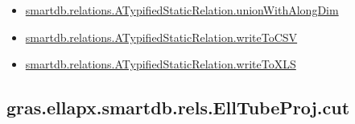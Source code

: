 \documentclass[letterpaper,10pt,english]{sphinxmanual}
\begin{document}
\begin{itemize}
\item {} 
{\hyperref[chap_functions:smartdb-relations-atypifiedstaticrelation-unionwithalongdim]{smartdb.relations.ATypifiedStaticRelation.unionWithAlongDim}}

\item {} 
{\hyperref[chap_functions:smartdb-relations-atypifiedstaticrelation-writetocsv]{smartdb.relations.ATypifiedStaticRelation.writeToCSV}}

\item {} 
{\hyperref[chap_functions:smartdb-relations-atypifiedstaticrelation-writetoxls]{smartdb.relations.ATypifiedStaticRelation.writeToXLS}}

\end{itemize}


\subsection{gras.ellapx.smartdb.rels.EllTubeProj.cut}
\label{chap_functions:gras-ellapx-smartdb-rels-elltubeproj-cut}
\end{document}

